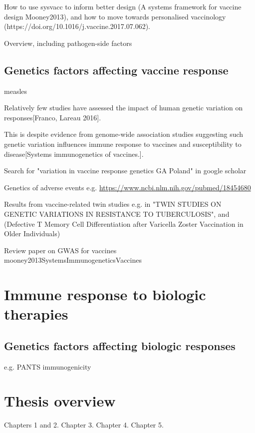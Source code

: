 How to use sysvacc to inform better design (A systems framework for vaccine design Mooney2013), and how to move towards personalised vaccinology (https://doi.org/10.1016/j.vaccine.2017.07.062).

Overview, including pathogen-side factors

\subsection{Genetics factors affecting vaccine response}


measles

Relatively few studies have assessed the impact of human genetic variation on responses[Franco, Lareau 2016].

This is despite evidence from genome-wide association studies suggesting such genetic variation influences immune response to vaccines and susceptibility to disease[Systems immunogenetics of vaccines.].

Search for "variation in vaccine response genetics GA Poland" in google scholar

Genetics of adverse events e.g. \url{https://www.ncbi.nlm.nih.gov/pubmed/18454680}

Results from vaccine-related twin studies e.g. in "TWIN STUDIES ON GENETIC VARIATIONS IN RESISTANCE TO TUBERCULOSIS", and (Defective T Memory Cell Differentiation after Varicella Zoster Vaccination in Older Individuals)

Review paper on GWAS for vaccines mooney2013SystemsImmunogeneticsVaccines

\section{Immune response to biologic therapies}

\subsection{Genetics factors affecting biologic responses}

e.g. PANTS immunogenicity 

\section{Thesis overview}

Chapters 1 and 2.
Chapter 3.
Chapter 4.
Chapter 5.
